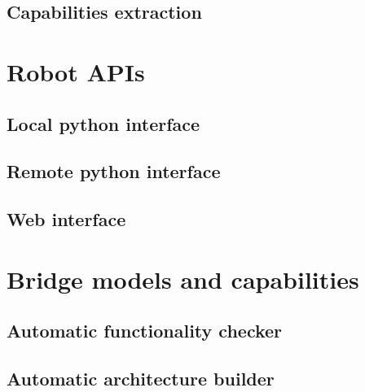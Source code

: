 \subsection{Capabilities extraction}
\lipsum[2-4]

\section{Robot APIs} 
\lipsum[2-4]

\subsection{Local python interface}
\lipsum[2-4]

\subsection{Remote python interface} 
\lipsum[2-4]

\subsection{Web interface}
\lipsum[2-4]

\section{Bridge models and capabilities}

\subsection{Automatic functionality checker}

\subsection{Automatic architecture builder}
